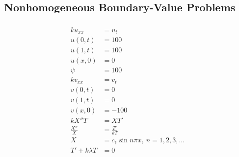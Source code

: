 \documentclass{article}
\begin{document}
\subsection{Nonhomogeneous Boundary-Value Problems}

\subsubsection{}

\begin{align*}
  k u_{xx}         & = u_t                                                                                             \\
  u(0, t)          & = 100                                                                                             \\
  u(1, t)          & = 100                                                                                             \\
  u(x, 0)          & = 0                                                                                               \\
  \psi             & = 100                                                                                             \\
  k v_{xx}         & = v_t                                                                                             \\
  v(0, t)          & = 0                                                                                               \\
  v(1, t)          & = 0                                                                                               \\
  v(x, 0)          & = -100                                                                                            \\
  k X'' T          & = X T'                                                                                            \\
  \frac{X''}{X}    & = \frac{T'}{k T}                                                                                  \\
  X                & = c_1 \sin n \pi x,\ n = 1, 2, 3, \ldots                                                          \\
  T' + k \lambda T & = 0                                                                                               \\

\end{align*}
\end{document}
